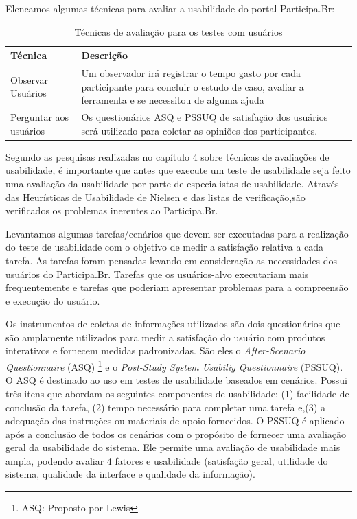 Elencamos algumas técnicas para avaliar a usabilidade do portal Participa.Br:

\begin{table}[h]
\begin{tabular}{|l| p{10cm} |}
\hline
Técnica & Descrição \\ \hline
Observar Usuários & Um observador irá registrar o tempo 
gasto por cada participante para concluir o estudo de caso, 
avaliar a ferramenta e se necessitou de alguma ajuda    \\ \hline
Perguntar aos usuários & Os questionários ASQ e PSSUQ 
de satisfação dos usuários será utilizado 
para coletar as opiniões dos participantes.\\ \hline
\end{tabular}
\caption{Técnicas de avaliação para os testes com usuários}
\end{table}


Segundo as pesquisas realizadas no capítulo 4 sobre técnicas de avaliações de usabilidade, é importante que antes que execute um teste de usabilidade seja feito uma avaliação da usabilidade por parte de especialistas de usabilidade.
%
Através das Heurísticas de Usabilidade de Nielsen e das listas de verificação,são verificados os problemas inerentes ao Participa.Br.

Levantamos algumas tarefas/cenários que devem ser executadas para a realização do teste de usabilidade com o objetivo de medir a satisfação relativa a cada tarefa. As tarefas foram pensadas levando em consideração as necessidades dos usuários do Participa.Br. Tarefas que os usuários-alvo executariam mais frequentemente e tarefas que poderiam apresentar problemas para a compreensão e execução do usuário. 

Os instrumentos de coletas de informações utilizados são dois questionários que são amplamente utilizados para medir a satisfação do usuário com produtos interativos e fornecem medidas padronizadas.
%
São eles o \textit{After-Scenario Questionnaire} (ASQ) \footnote{ASQ: Proposto por Lewis} e o \textit{Post-Study System Usabiliy Questionnaire} (PSSUQ). 
%
O ASQ é destinado ao uso em testes de usabilidade baseados em cenários. Possui três itens que abordam os seguintes componentes de usabilidade: (1) facilidade de conclusão da tarefa, (2) tempo necessário para completar uma tarefa e,(3) a adequação das instruções ou materiais de apoio fornecidos.
%
O PSSUQ é aplicado após a conclusão de todos os cenários com o propósito de fornecer uma avaliação geral da usabilidade do sistema. Ele permite uma avaliação de usabilidade mais ampla, podendo avaliar 4 fatores e usabilidade (satisfação geral, utilidade do sistema, qualidade da interface e qualidade da informação). 


